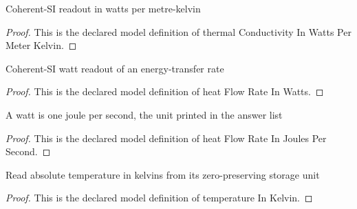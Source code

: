 \begin{definition}
  \label{def:physics:phyx-mini-0466:phyxminiproblems-problemphyxmini0466-thermalconductivityinwattspermeterkelvin}
  Coherent-SI readout in watts per metre-kelvin
\end{definition}
\begin{proof}
  This is the declared model definition of thermal Conductivity In Watts Per Meter Kelvin.
\end{proof}
\begin{definition}
  \label{def:physics:phyx-mini-0466:phyxminiproblems-problemphyxmini0466-heatflowrateinwatts}
  Coherent-SI watt readout of an energy-transfer rate
\end{definition}
\begin{proof}
  This is the declared model definition of heat Flow Rate In Watts.
\end{proof}
\begin{definition}
  \label{def:physics:phyx-mini-0466:phyxminiproblems-problemphyxmini0466-heatflowrateinjoulespersecond}
  A watt is one joule per second, the unit printed in the answer list
\end{definition}
\begin{proof}
  This is the declared model definition of heat Flow Rate In Joules Per Second.
\end{proof}
\begin{definition}
  \label{def:physics:phyx-mini-0466:phyxminiproblems-problemphyxmini0466-temperatureinkelvin}
  Read absolute temperature in kelvins from its zero-preserving storage unit
\end{definition}
\begin{proof}
  This is the declared model definition of temperature In Kelvin.
\end{proof}
